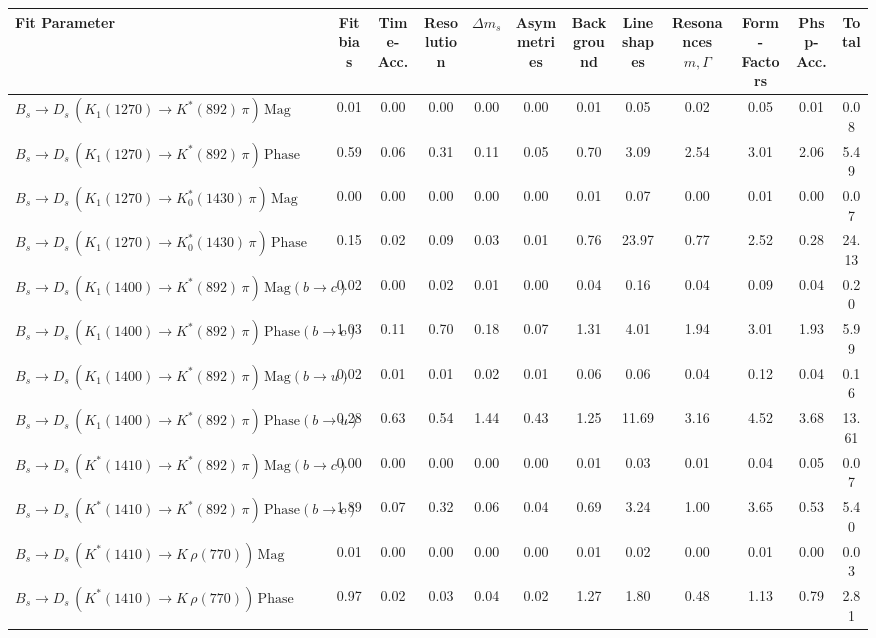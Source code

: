 \begin{tabular}{l  c  c  c  c  c  c  c  c  c  c  | c }
\hline
\hline
Fit Parameter & Fit bias & Time-Acc. & Resolution & $\Delta m_{s}$ & Asymmetries & Background & Lineshapes & Resonances $m,\Gamma$ & Form-Factors & Phsp-Acc. &  Total  \\ 
\hline
$B_s \to D_s \, ( K_1(1270) \to K^{*}(892) \, \pi ) \, \text{Mag}$ & 0.01 & 0.00 & 0.00 & 0.00 & 0.00 & 0.01 & 0.05 & 0.02 & 0.05 & 0.01 & 0.08 \\ 
$B_s \to D_s \, ( K_1(1270) \to K^{*}(892) \, \pi ) \, \text{Phase}$ & 0.59 & 0.06 & 0.31 & 0.11 & 0.05 & 0.70 & 3.09 & 2.54 & 3.01 & 2.06 & 5.49 \\ 
$B_s \to D_s \, ( K_1(1270) \to K^{*}_{0}(1430) \, \pi ) \, \text{Mag} $ & 0.00 & 0.00 & 0.00 & 0.00 & 0.00 & 0.01 & 0.07 & 0.00 & 0.01 & 0.00 & 0.07 \\ 
$B_s \to D_s \, ( K_1(1270) \to K^{*}_{0}(1430) \, \pi ) \, \text{Phase} $ & 0.15 & 0.02 & 0.09 & 0.03 & 0.01 & 0.76 & 23.97 & 0.77 & 2.52 & 0.28 & 24.13 \\ 
$B_s \to D_s \, ( K_1(1400) \to K^{*}(892) \, \pi ) \, \text{Mag} (b \to c)$ & 0.02 & 0.00 & 0.02 & 0.01 & 0.00 & 0.04 & 0.16 & 0.04 & 0.09 & 0.04 & 0.20 \\ 
$B_s \to D_s \, ( K_1(1400) \to K^{*}(892) \, \pi ) \, \text{Phase} (b \to c)$ & 1.03 & 0.11 & 0.70 & 0.18 & 0.07 & 1.31 & 4.01 & 1.94 & 3.01 & 1.93 & 5.99 \\ 
$B_s \to D_s \, ( K_1(1400) \to K^{*}(892) \, \pi ) \, \text{Mag} (b \to u)$ & 0.02 & 0.01 & 0.01 & 0.02 & 0.01 & 0.06 & 0.06 & 0.04 & 0.12 & 0.04 & 0.16 \\ 
$B_s \to D_s \, ( K_1(1400) \to K^{*}(892) \, \pi ) \, \text{Phase} (b \to u)$ & 0.28 & 0.63 & 0.54 & 1.44 & 0.43 & 1.25 & 11.69 & 3.16 & 4.52 & 3.68 & 13.61 \\ 
$B_s \to D_s \, ( K^{*}(1410) \to K^{*}(892) \, \pi ) \, \text{Mag} (b \to c)$ & 0.00 & 0.00 & 0.00 & 0.00 & 0.00 & 0.01 & 0.03 & 0.01 & 0.04 & 0.05 & 0.07 \\ 
$B_s \to D_s \, ( K^{*}(1410) \to K^{*}(892) \, \pi ) \, \text{Phase} (b \to c)$ & 1.89 & 0.07 & 0.32 & 0.06 & 0.04 & 0.69 & 3.24 & 1.00 & 3.65 & 0.53 & 5.40 \\ 
$B_s \to D_s \, ( K^{*}(1410) \to K \, \rho(770) ) \, \text{Mag}$ & 0.01 & 0.00 & 0.00 & 0.00 & 0.00 & 0.01 & 0.02 & 0.00 & 0.01 & 0.00 & 0.03 \\ 
$B_s \to D_s \, ( K^{*}(1410) \to K \, \rho(770) ) \, \text{Phase}$ & 0.97 & 0.02 & 0.03 & 0.04 & 0.02 & 1.27 & 1.80 & 0.48 & 1.13 & 0.79 & 2.81 \\ 

\end{tabular}
